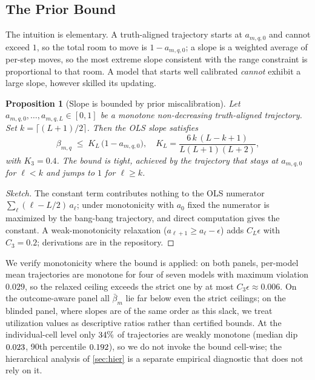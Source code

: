 \documentclass[conference]{IEEEtran}
\theoremstyle{plain}
\newtheorem{proposition}{Proposition}
\theoremstyle{remark}
\begin{document}
\subsection{The Prior Bound}

The intuition is elementary. A truth-aligned trajectory starts at $a_{m,q,0}$ and cannot exceed $1$, so the total room to move is $1-a_{m,q,0}$; a slope is a weighted average of per-step moves, so the most extreme slope consistent with the range constraint is proportional to that room. A model that starts well calibrated \emph{cannot} exhibit a large slope, however skilled its updating.

\begin{proposition}[Slope is bounded by prior miscalibration]
\label{prop:bound}
Let $a_{m,q,0}, \ldots, a_{m,q,L} \in [0,1]$ be a monotone non-decreasing truth-aligned trajectory. Set $k = \lceil (L+1)/2 \rceil$. Then the OLS slope satisfies
\[
  \beta_{m,q} \;\leq\; K_L\,\bigl(1 - a_{m,q,0}\bigr),
  \quad K_L = \frac{6\,k\,(L-k+1)}{L(L+1)(L+2)},
\]
with $K_3 = 0.4$. The bound is tight, achieved by the trajectory that stays at $a_{m,q,0}$ for $\ell < k$ and jumps to $1$ for $\ell \ge k$.
\end{proposition}

\begin{proof}[Sketch]
The constant term contributes nothing to the OLS numerator $\sum_\ell (\ell - L/2)\,a_\ell$; under monotonicity with $a_0$ fixed the numerator is maximized by the bang-bang trajectory, and direct computation gives the constant. A weak-monotonicity relaxation ($a_{\ell+1} \ge a_\ell - \epsilon$) adds $C_L\epsilon$ with $C_3 = 0.2$; derivations are in the repository.
\end{proof}

We verify monotonicity where the bound is applied: on both panels, per-model mean trajectories are monotone for four of seven models with maximum violation $0.029$, so the relaxed ceiling exceeds the strict one by at most $C_3\epsilon \approx 0.006$. On the outcome-aware panel all $\bar\beta_m$ lie far below even the strict ceilings; on the blinded panel, where slopes are of the same order as this slack, we treat utilization values as descriptive ratios rather than certified bounds. At the individual-cell level only $34\%$ of trajectories are weakly monotone (median dip $0.023$, 90th percentile $0.192$), so we do not invoke the bound cell-wise; the hierarchical analysis of \cref{sec:hier} is a separate empirical diagnostic that does not rely on it.
\end{document}
